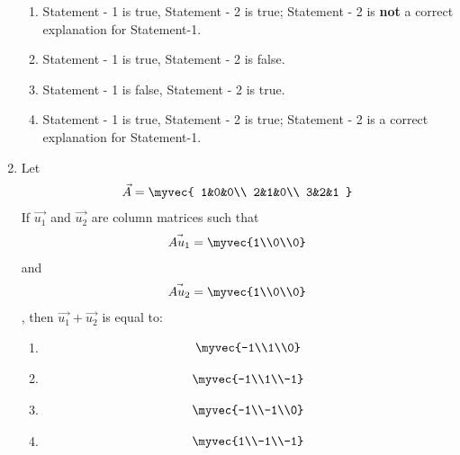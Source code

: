 \begin{enumerate}
	\begin{enumerate}
		\item Statement - 1 is true, Statement - 2 is true; Statement - 2 is \textbf{not} a correct explanation for Statement-1. 
	    	\item Statement - 1 is true, Statement - 2 is false. 
	    	\item Statement - 1 is false, Statement - 2 is true.
	    	\item Statement - 1 is true, Statement - 2 is true; Statement - 2 is a correct explanation for Statement-1. 
	\end{enumerate}

	\item Let \begin{align*}
	\vec{A} = \myvec{ 
		1&0&0\\
		2&1&0\\
		3&2&1
	}
	\end{align*} If $\vec{u_1}$ and $\vec{u_2}$ are column matrices such that
	\begin{align*}
		\vec{Au_1} = \myvec{1\\0\\0}
	\end{align*} and 
	\begin{align*}
		\vec{Au_2} = \myvec{1\\0\\0}
	\end{align*}, then $\vec{u_1} + \vec{u_2}$ is equal to:
	\hfill{}
        \begin{enumerate}
	    	\item \begin{align*} \myvec{-1\\1\\0} \end{align*} 
		\item \begin{align*} \myvec{-1\\1\\-1} \end{align*} 
		\item \begin{align*} \myvec{-1\\-1\\0} \end{align*}
		\item \begin{align*} \myvec{1\\-1\\-1} \end{align*} 
        \end{enumerate}


\end{enumerate}
